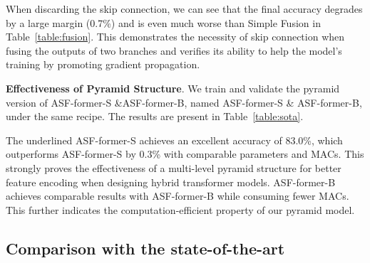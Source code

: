 \documentclass[lettersize,journal]{IEEEtran}
\begin{document}
When discarding the skip connection, we can see that the final accuracy degrades by a large margin (0.7\%) and is even much worse than Simple Fusion in Table~\ref{table:fusion}. This demonstrates the necessity of skip connection when fusing the outputs of two branches and verifies its ability to help the model's training by promoting gradient propagation.

\textbf{Effectiveness of Pyramid Structure}. We train and validate the pyramid version of ASF-former-S \&ASF-former-B, named ASF-former-S \& ASF-former-B, under the same recipe. The results are present in Table~\ref{table:sota}.

The underlined ASF-former-S achieves an excellent accuracy of 83.0\%, which outperforms ASF-former-S by 0.3\% with comparable parameters and MACs. This strongly proves the effectiveness of a multi-level pyramid structure for better feature encoding when designing hybrid transformer models. ASF-former-B achieves comparable results with ASF-former-B while consuming fewer MACs. This further indicates the computation-efficient property of our pyramid model.

\subsection{Comparison with the state-of-the-art}
\end{document}
